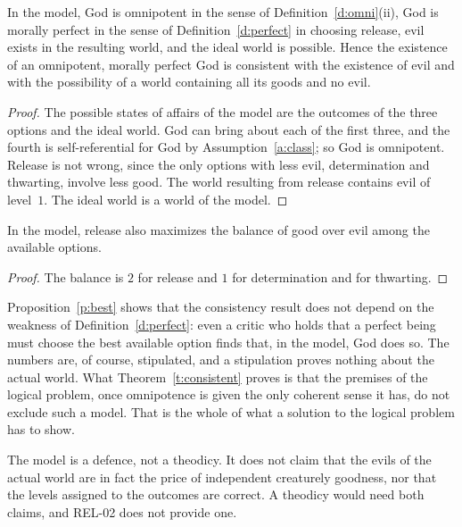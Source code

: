 \documentclass{situationist-preprint}
\begin{document}
\begin{theorem}[Consistency]\label{t:consistent}
In the model, God is omnipotent in the sense of Definition~\ref{d:omni}(ii), God is morally perfect in the sense of Definition~\ref{d:perfect} in choosing release, evil exists in the resulting world, and the ideal world is possible. Hence the existence of an omnipotent, morally perfect God is consistent with the existence of evil and with the possibility of a world containing all its goods and no evil.
\end{theorem}

\begin{proof}
The possible states of affairs of the model are the outcomes of the three options and the ideal world. God can bring about each of the first three, and the fourth is self-referential for God by Assumption~\ref{a:class}; so God is omnipotent. Release is not wrong, since the only options with less evil, determination and thwarting, involve less good. The world resulting from release contains evil of level~$1$. The ideal world is a world of the model.
\end{proof}

\begin{proposition}\label{p:best}
In the model, release also maximizes the balance of good over evil among the available options.
\end{proposition}

\begin{proof}
The balance is $2$ for release and $1$ for determination and for thwarting.
\end{proof}

Proposition~\ref{p:best} shows that the consistency result does not depend on the weakness of Definition~\ref{d:perfect}: even a critic who holds that a perfect being must choose the best available option finds that, in the model, God does so. The numbers are, of course, stipulated, and a stipulation proves nothing about the actual world. What Theorem~\ref{t:consistent} proves is that the premises of the logical problem, once omnipotence is given the only coherent sense it has, do not exclude such a model. That is the whole of what a solution to the logical problem has to show.

\begin{remark}\label{r:defence}
The model is a defence, not a theodicy. It does not claim that the evils of the actual world are in fact the price of independent creaturely goodness, nor that the levels assigned to the outcomes are correct. A theodicy would need both claims, and REL-02 does not provide one.
\end{remark}
\end{document}
